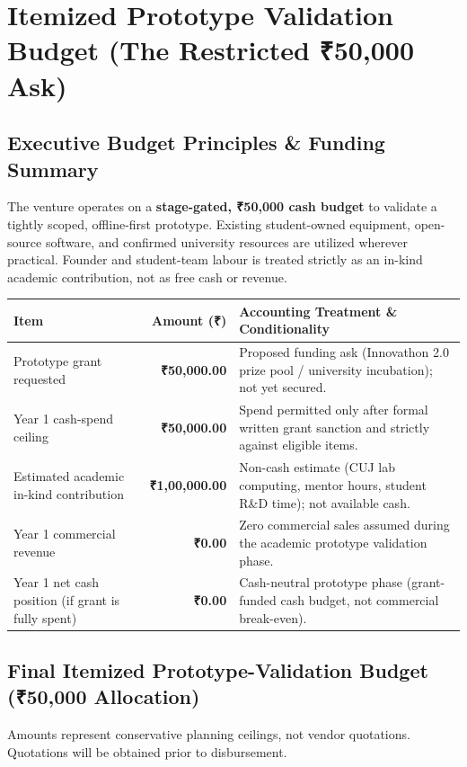 \documentclass[11pt,a4paper]{article}
\begin{document}
\vspace{0.2cm}

\section{Itemized Prototype Validation Budget (The Restricted ₹50,000 Ask)}

\subsection{Executive Budget Principles \& Funding Summary}
The venture operates on a \textbf{stage-gated, ₹50,000 cash budget} to validate a tightly scoped, offline-first prototype. Existing student-owned equipment, open-source software, and confirmed university resources are utilized wherever practical. Founder and student-team labour is treated strictly as an in-kind academic contribution, not as free cash or revenue.

\vspace{0.15cm}
\noindent
\begin{tabularx}{\textwidth}{|l|r|Y|}
\hline
\textbf{Item} & \textbf{Amount (₹)} & \textbf{Accounting Treatment \& Conditionality} \\
\hline
Prototype grant requested & \textbf{₹50,000.00} & Proposed funding ask (Innovathon 2.0 prize pool / university incubation); not yet secured. \\
\hline
Year 1 cash-spend ceiling & \textbf{₹50,000.00} & Spend permitted only after formal written grant sanction and strictly against eligible items. \\
\hline
Estimated academic in-kind contribution & \textbf{₹1,00,000.00} & Non-cash estimate (CUJ lab computing, mentor hours, student R\&D time); not available cash. \\
\hline
Year 1 commercial revenue & \textbf{₹0.00} & Zero commercial sales assumed during the academic prototype validation phase. \\
\hline
Year 1 net cash position (if grant is fully spent) & \textbf{₹0.00} & Cash-neutral prototype phase (grant-funded cash budget, not commercial break-even). \\
\hline
\end{tabularx}

\vspace{0.2cm}
\subsection{Final Itemized Prototype-Validation Budget (₹50,000 Allocation)}
Amounts represent conservative planning ceilings, not vendor quotations. Quotations will be obtained prior to disbursement.
\end{document}
